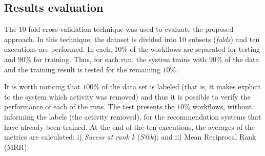 \documentclass[10pt,letterpaper]{article}
\begin{document}
\subsection*{Results evaluation}
%
%
The 10-fold-cross-validation technique was used to evaluate the proposed approach. In this technique, the dataset is divided into 10 subsets (\emph{folds}) and ten executions are performed. In each, \(10\%\) of the workflows are separated for testing and \(90\%\) for training. Thus, for each run, the system trains with \(90\%\) of the data and the training result is tested for the remaining \(10​​\%\).

It is worth noticing that \(100\%\) of the data set is labeled (that is, it makes explicit to the system which activity was removed) and thus it is possible to verify the performance of each of the runs. The test presents the \(10​​\%\) workflows, without informing the labels (the activity removed), for the recommendation systems that have already been trained. At the end of the ten executions, the averages of the metrics are calculated: i) \emph{Sucess at rank k} (\(S@k\)); and ii) Mean Reciprocal Rank (MRR).
\end{document}
